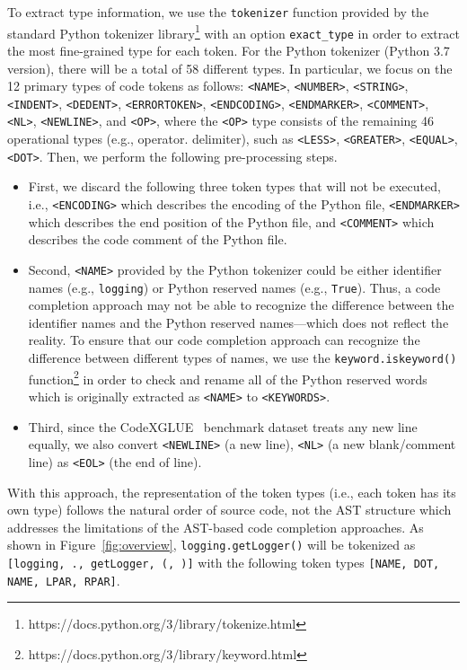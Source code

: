 To extract type information, we use the \texttt{tokenizer} function provided by the standard Python tokenizer library\footnote{https://docs.python.org/3/library/tokenize.html} with an option \texttt{exact\_type} in order to extract the most fine-grained type for each token.
For the Python tokenizer (Python 3.7 version), there will be a total of 58 different types.
In particular, we focus on the 12 primary types of code tokens as follows: \texttt{<NAME>}, \texttt{<NUMBER>}, \texttt{<STRING>}, \texttt{<INDENT>}, \texttt{<DEDENT>}, \texttt{<ERRORTOKEN>}, \texttt{<ENDCODING>}, \texttt{<ENDMARKER>}, \texttt{<COMMENT>}, \texttt{<NL>}, \texttt{<NEWLINE>}, and \texttt{<OP>}, where the \texttt{<OP>} type consists of the remaining 46 operational types (e.g., operator. delimiter), such as \texttt{<LESS>}, \texttt{<GREATER>}, \texttt{<EQUAL>}, \texttt{<DOT>}.
Then, we perform the following pre-processing steps.

\begin{itemize}
    \item First, we discard the following three token types that will not be executed, i.e., \texttt{<ENCODING>} which describes the encoding of the Python file, \texttt{<ENDMARKER>} which describes the end position of the Python file, and \texttt{<COMMENT>} which describes the code comment of the Python file.
    \item Second, \texttt{<NAME>} provided by the Python tokenizer could be either identifier names (e.g., \texttt{logging}) or Python reserved names (e.g., \texttt{True}).
    Thus, a code completion approach may not be able to recognize the difference between the identifier names and the Python reserved names---which does not reflect the reality.
    To ensure that our code completion approach can recognize the difference between different types of names, we use the \texttt{keyword.iskeyword()} function\footnote{https://docs.python.org/3/library/keyword.html} in order to check and rename all of the Python reserved words which is originally extracted as  \texttt{<NAME>} to \texttt{<KEYWORDS>}. 
    \item Third, since the CodeXGLUE~\cite{lu2021codexglue} benchmark dataset treats any new line equally, we also convert  \texttt{<NEWLINE>} (a new line), \texttt{<NL>} (a new blank/comment line) as \texttt{<EOL>} (the end of line).
\end{itemize}


With this approach, the representation of the token types (i.e., each token has its own type) follows the natural order of source code, not the AST structure which addresses the limitations of the AST-based code completion approaches.
As shown in Figure~\ref{fig:overview},  \texttt{logging.getLogger()} will be tokenized as \texttt{[logging, ., getLogger, (, )]} with the following token types \texttt{[NAME, DOT, NAME, LPAR, RPAR]}.






